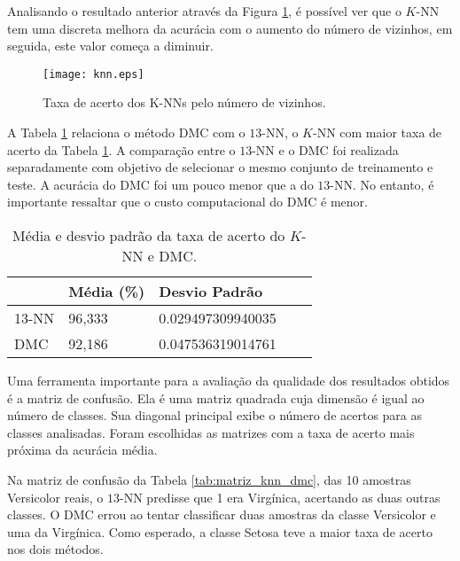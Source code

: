 \documentclass{article}
\begin{document}
Analisando o resultado anterior através da Figura \ref{img:knn}, é possível ver que o $K$-NN tem uma discreta melhora da acurácia com o aumento do número de vizinhos, em seguida, este valor começa a diminuir.

\begin{figure}[H]
\begin{center}
	\texttt{[image: knn.eps]}
	\caption{Taxa de acerto dos K-NNs pelo número de vizinhos.}
	\label{img:knn}
	\end{center}
\end{figure}

A Tabela \ref{tab:knn_dmc} relaciona o método DMC com o $13$-NN, o $K$-NN com maior taxa de acerto da Tabela \ref{img:knn}. A comparação entre o $13$-NN e o DMC foi realizada separadamente com objetivo de selecionar o mesmo conjunto de treinamento e teste. A acurácia do DMC foi um pouco menor que a do $13$-NN. No entanto, é importante ressaltar que o custo computacional do DMC é menor.

\begin{table}[h]
	\centering
	\vspace{0.5cm}
\begin{tabular}{lllll}
\hline
  & Média (\%) & Desvio Padrão \\ \hline
13-NN & 96,333 & \num{0,029497309940035} \\ \hline
DMC & 92,186 & \num{0,047536319014761} \\ \hline
\end{tabular}
\caption{Média e desvio padrão da taxa de acerto do $K$-NN e DMC.}\label{tab:knn_dmc}
\end{table}


Uma ferramenta importante para a avaliação da qualidade dos resultados obtidos é a matriz de confusão. Ela é uma matriz quadrada cuja dimensão é igual ao número de classes. Sua diagonal principal exibe o número de acertos para as classes analisadas. Foram escolhidas as matrizes com a taxa de acerto mais próxima da acurácia média. 

Na matriz de confusão da Tabela \ref{tab:matriz_knn_dmc}, das 10 amostras Versicolor reais, o $13$-NN predisse que 1 era Virgínica, acertando as duas outras classes. O DMC errou ao tentar classificar duas amostras da classe Versicolor  e uma da Virgínica. Como esperado, a classe Setosa teve a maior taxa de acerto nos dois métodos.
\end{document}
